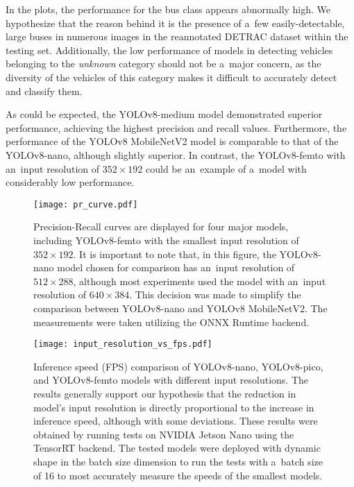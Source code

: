 In the plots, the performance for the bus class appears abnormally high. We
hypothesize that the reason behind it is the presence of a~few
easily-detectable, large buses in numerous images in the reannotated DETRAC
dataset within the testing set. Additionally, the low performance of models in
detecting vehicles belonging to the \textit{unknown} category should not be
a~major concern, as the diversity of the vehicles of this category makes it
difficult to accurately detect and classify them.

As could be expected, the YOLOv8-medium model demonstrated superior performance,
achieving the highest precision and recall values. Furthermore, the performance
of the YOLOv8 MobileNetV2 model is comparable to that of the YOLOv8-nano,
although slightly superior. In contrast, the YOLOv8-femto with an~input
resolution of $352 \times 192$ could be an~example of a~model with considerably
low performance.

\begin{figure}[H]
        \centering
        \texttt{[image: pr\_curve.pdf]}
        \caption{Precision-Recall curves are displayed for four major models,
        including YOLOv8-femto with the smallest input resolution of $352 \times
        192$. It is important to note that, in this figure, the YOLOv8-nano
        model chosen for comparison has an~input resolution of $512 \times 288$,
        although most experiments used the model with an~input resolution of
        $640 \times 384$. This decision was made to simplify the comparison
        between YOLOv8-nano and YOLOv8 MobileNetV2. The measurements were taken
        utilizing the ONNX Runtime backend.}
        \label{PRCurveMajor}
\end{figure}

\begin{figure}[H]
        \centering
        \texttt{[image: input\_resolution\_vs\_fps.pdf]}
        \caption{Inference speed (FPS) comparison of YOLOv8-nano, YOLOv8-pico, and
        YOLOv8-femto models with different input resolutions. The results generally
        support our hypothesis that the reduction in model's input resolution is directly
        proportional to the increase in inference speed, although with some
        deviations. These results were obtained by running tests on NVIDIA Jetson
        Nano using the TensorRT backend. The tested models were deployed with
        dynamic shape in the batch size dimension to run the tests with a~batch size
        of 16 to most accurately measure the speeds of the smallest models.}
        \label{InputResolutionVSFPS}
\end{figure}


